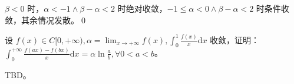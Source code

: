 $\displaystyle \beta < 0$ 时，$\displaystyle \alpha < -1\land \beta -\alpha < 2$ 时绝对收敛，$\displaystyle -1\leqslant \alpha < 0\land \beta -\alpha < 2$ 时条件收敛，其余情况发散。\qed 



\begin{ques}
	设 $\displaystyle f( x) \in C[ 0,+\infty ) ,\alpha =\lim _{x\rightarrow +\infty } f( x) ,\int _{0}^{1}\frac{f( x)}{x}\mathrm{d} x$ 收敛，证明：$\displaystyle \int _{0}^{+\infty }\frac{f( ax) -f( bx)}{x}\mathrm{d} x=\alpha \ln\frac{a}{b} ,\forall 0< a< b$。
\end{ques}







TBD。
\ifx\allfiles\undefined

\fi